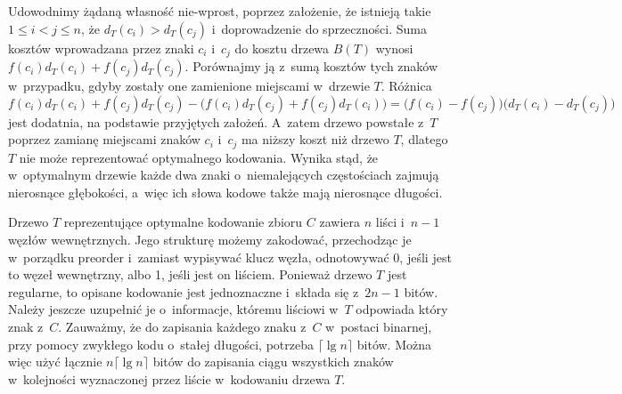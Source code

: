 Udowodnimy żądaną własność nie-wprost, poprzez założenie, że istnieją takie $1\le i<j\le n$, że $d_T(c_i)>d_T(c_j)$ i~doprowadzenie do sprzeczności.
Suma kosztów wprowadzana przez znaki $c_i$ i~$c_j$ do kosztu drzewa $B(T)$ wynosi $f(c_i)d_T(c_i)+f(c_j)d_T(c_j)$.
Porównajmy ją z~sumą kosztów tych znaków w~przypadku, gdyby zostały one zamienione miejscami w~drzewie $T$.
Różnica
\[
	f(c_i)d_T(c_i)+f(c_j)d_T(c_j)-\bigl(f(c_i)d_T(c_j)+f(c_j)d_T(c_i)\bigr) = \bigl(f(c_i)-f(c_j)\bigr)\bigl(d_T(c_i)-d_T(c_j)\bigr)
\]
jest dodatnia, na podstawie przyjętych założeń.
A~zatem drzewo powstałe z~$T$ poprzez zamianę miejscami znaków $c_i$ i~$c_j$ ma niższy koszt niż drzewo $T$, dlatego $T$ nie może reprezentować optymalnego kodowania.
Wynika stąd, że w~optymalnym drzewie każde dwa znaki o~niemalejących częstościach zajmują nierosnące głębokości, a~więc ich słowa kodowe także mają nierosnące długości.

\exercise %
Drzewo $T$ reprezentujące optymalne kodowanie zbioru $C$ zawiera $n$ liści i~$n-1$ węzłów wewnętrznych.
Jego strukturę możemy zakodować, przechodząc je w~porządku preorder i~zamiast wypisywać klucz węzła, odnotowywać 0, jeśli jest to węzeł wewnętrzny, albo 1, jeśli jest on liściem.
Ponieważ drzewo $T$ jest regularne, to opisane kodowanie jest jednoznaczne i~składa się z~$2n-1$ bitów.
Należy jeszcze uzupełnić je o~informacje, któremu liściowi w~$T$ odpowiada który znak z~$C$.
Zauważmy, że do zapisania każdego znaku z~$C$ w~postaci binarnej, przy pomocy zwykłego kodu o~stałej długości, potrzeba $\lceil\lg n\rceil$ bitów.
Można więc użyć łącznie $n\lceil\lg n\rceil$ bitów do zapisania ciągu wszystkich znaków w~kolejności wyznaczonej przez liście w~kodowaniu drzewa $T$.

\exercise %
\exercise %
\exercise %
